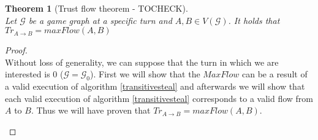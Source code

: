 \documentclass[11pt]{article}
\newtheorem{theorem}{Theorem}[section]
\theoremstyle{definition}
\theoremstyle{corollary}
\theoremstyle{lemma}
\begin{document}
    \begin{theorem}[Trust flow theorem - TOCHECK] \ \\
       \label{trustflow}
       Let $\mathcal{G}$ be a game graph at a specific turn and $A, B \in V(\mathcal{G})$. It holds that
       $Tr_{A \rightarrow B} = maxFlow(A, B)$
    \end{theorem}
    \begin{proof} \ \\
       Without loss of generality, we can suppose that the turn in which we are interested is 0 ($\mathcal{G} =
       \mathcal{G}_0$). First we will show that the $MaxFlow$ can be a result of a valid execution of algorithm
       \ref{transitivesteal} and afterwards we will show that each valid execution of algorithm \ref{transitivesteal}
       corresponds to a valid flow from $A$ to $B$. Thus we will have proven that $Tr_{A \rightarrow B} = maxFlow(A, B)$.
       \begin{itemize}

\end{itemize}
\end{proof}
\end{document}
